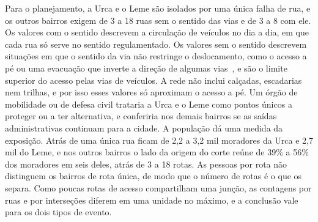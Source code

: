 Para o planejamento, a Urca e o Leme são isolados por uma única falha de rua, e
os outros bairros exigem de 3 a 18 ruas sem o sentido das vias e de 3 a 8 com
ele. Os valores com o sentido descrevem a circulação de veículos no dia a dia,
em que cada rua só serve no sentido regulamentado. Os valores sem o sentido
descrevem situações em que o sentido da via não restringe o deslocamento, como
o acesso a pé ou uma evacuação que inverte a direção de algumas
vias~\cite{behrooz2025adaptive}, e são o limite superior do acesso pelas vias
de veículos. A rede não inclui calçadas, escadarias nem trilhas, e por isso
esses valores só aproximam o acesso a pé. Um órgão de mobilidade ou de defesa
civil trataria a Urca e o Leme como pontos únicos a proteger ou a ter
alternativa, e conferiria nos demais bairros se as saídas administrativas
continuam para a cidade. A população dá uma medida da exposição. Atrás de uma
única rua ficam de 2,2 a 3,2 mil moradores da Urca e 2,7 mil do Leme, e nos
outros bairros o lado da origem do corte reúne de 39\% a 56\% dos moradores em
seis deles, atrás de 3 a 18 rotas. As pessoas por rota não distinguem os
bairros de rota única, de modo que o número de rotas é o que os separa. Como
poucas rotas de acesso compartilham uma junção, as contagens por ruas e por
interseções diferem em uma unidade no máximo, e a conclusão vale para os dois
tipos de evento.

